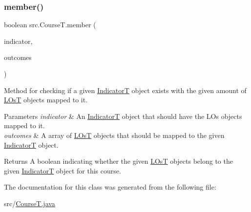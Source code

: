 \subsubsection{\texorpdfstring{member()}{member()}}
{\footnotesize\ttfamily boolean src.\+Course\+T.\+member (\begin{DoxyParamCaption}\item[{\hyperlink{enumsrc_1_1IndicatorT}{IndicatorT}}]{indicator,  }\item[{\hyperlink{classsrc_1_1LOsT}{L\+OsT} \mbox{[}$\,$\mbox{]}}]{outcomes }\end{DoxyParamCaption})}



Method for checking if a given \hyperlink{enumsrc_1_1IndicatorT}{IndicatorT} object exists with the given amount of \hyperlink{classsrc_1_1LOsT}{L\+OsT} objects mapped to it. 


\begin{DoxyParams}{Parameters}
{\em indicator} & An \hyperlink{enumsrc_1_1IndicatorT}{IndicatorT} object that should have the L\+Os objects mapped to it. \\
\hline
{\em outcomes} & A array of \hyperlink{classsrc_1_1LOsT}{L\+OsT} objects that should be mapped to the given \hyperlink{enumsrc_1_1IndicatorT}{IndicatorT} object. \\
\hline
\end{DoxyParams}
\begin{DoxyReturn}{Returns}
A boolean indicating whether the given \hyperlink{classsrc_1_1LOsT}{L\+OsT} objects belong to the given \hyperlink{enumsrc_1_1IndicatorT}{IndicatorT} object for this course. 
\end{DoxyReturn}


The documentation for this class was generated from the following file\+:\begin{DoxyCompactItemize}
\item 
src/\hyperlink{CourseT_8java}{Course\+T.\+java}\end{DoxyCompactItemize}

